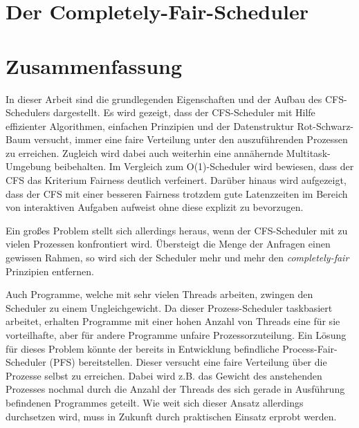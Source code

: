 \documentclass[ngerman]{seminarvorlage}
\begin{document}





\newpage
\section{Der Completely-Fair-Scheduler}\label{s:cfsmain}





\section{Zusammenfassung}\label{s:end}
In dieser Arbeit sind die grundlegenden Eigenschaften und der Aufbau des CFS-Schedulers dargestellt. Es wird gezeigt, dass der CFS-Scheduler mit Hilfe effizienter Algorithmen, einfachen Prinzipien und der Datenstruktur Rot-Schwarz-Baum versucht, immer eine faire Verteilung unter den auszuführenden Prozessen zu erreichen. Zugleich wird dabei auch weiterhin eine annähernde Multitask-Um\-gebung beibehalten. Im Vergleich zum O(1)-Scheduler wird bewiesen, dass der CFS das Kriterium Fairness deutlich verfeinert. Darüber hinaus wird aufgezeigt, dass der CFS mit einer besseren Fairness trotzdem gute Latenzzeiten im Bereich von interaktiven Aufgaben aufweist ohne diese explizit zu bevorzugen.

Ein großes Problem stellt sich allerdings heraus, wenn der CFS-Scheduler mit zu vielen Prozessen konfrontiert wird. Über\-steigt die Menge der Anfragen einen gewissen Rahmen, so wird sich der Scheduler mehr und mehr den  \textit{com\-pletely-fair} Prinzipien entfernen.  

Auch Programme, welche mit sehr vielen Threads arbeiten, zwingen den Scheduler zu einem Ungleichgewicht. Da dieser Prozess-Scheduler taskbasiert arbeitet, erhalten Programme mit einer hohen Anzahl von Threads eine für sie vorteilhafte, aber für andere Programme unfaire Prozessorzuteilung. Ein Lösung für dieses Problem könnte der bereits in Entwicklung befindliche Process-Fair-Sched\-uler (PFS) bereitstellen. Dieser versucht eine faire Verteilung über die Prozesse selbst zu erreichen. Dabei wird z.B. das Gewicht des anstehenden Prozesses nochmal durch die Anzahl der Threads des sich gerade in Ausführung befindenen Programmes geteilt. Wie weit sich dieser Ansatz allerdings durchsetzen wird, muss in Zukunft durch praktischen Einsatz erprobt werden.
\end{document}
